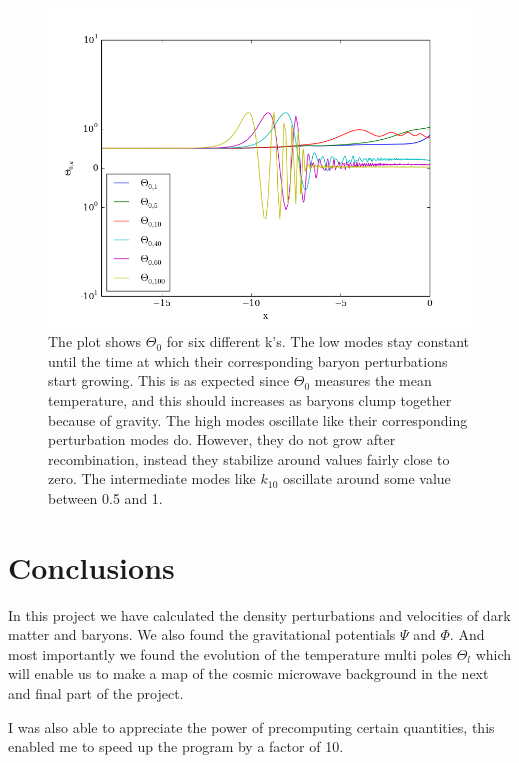 \documentclass[a4paper]{report}
\begin{document}
\begin{figure}[ht]
 \includegraphics[width=\textwidth]{Theta0.png}
 \caption{The plot shows $\Theta_0$ for six different k's. The low modes stay constant until the time at which their corresponding baryon perturbations start growing. This is as expected since $\Theta_0$ measures the mean temperature, and this should increases as baryons clump together because of gravity. The high modes oscillate like their corresponding perturbation modes do. However, they do not grow after recombination, instead they stabilize around values fairly close to zero. The intermediate modes like $k_{10}$ oscillate around some value between 0.5 and 1.}
 \label{fig:Theta0}
\end{figure}

\section{Conclusions} \label{sec:conclusions}
In this project we have calculated the density perturbations and velocities of dark matter and baryons. We also found the gravitational potentials $\Psi$ and $\Phi$. And most importantly we found the evolution of the temperature multi poles $\Theta_l$ which will enable us to make a map of the cosmic microwave background in the next and final part of the project.

I was also able to appreciate the power of precomputing certain quantities, this enabled me to speed up the program by a factor of 10.
\end{document}
